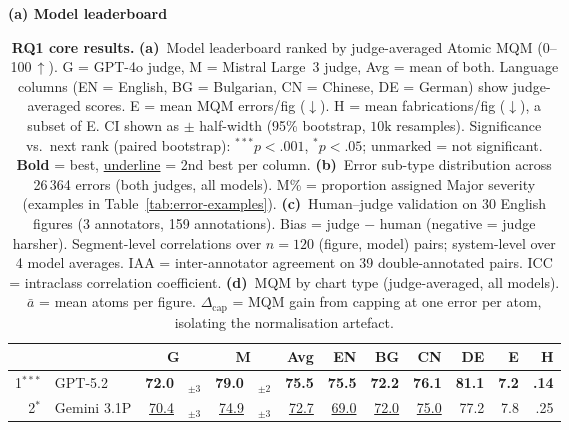 \begin{table}[t]
\centering
\caption{\textbf{RQ1 core results.}
  \textbf{(a)}~Model leaderboard ranked by judge-averaged Atomic MQM (0--100\,$\uparrow$). G = GPT-4o judge, M = Mistral Large~3 judge, Avg = mean of both. Language columns (EN = English, BG = Bulgarian, CN = Chinese, DE = German) show judge-averaged scores. E = mean MQM errors/fig ($\downarrow$). H = mean fabrications/fig ($\downarrow$), a subset of E. CI shown as $\pm$ half-width (95\% bootstrap, $10\text{k}$ resamples). Significance vs.\ next rank (paired bootstrap): $^{***}\!p{<}.001$, $^{*}\!p{<}.05$; unmarked = not significant. \textbf{Bold} = best, \underline{underline} = 2nd best per column.
  \textbf{(b)}~Error sub-type distribution across 26\,364 errors (both judges, all models). M\% = proportion assigned Major severity (examples in Table~\ref{tab:error-examples}).
  \textbf{(c)}~Human--judge validation on 30 English figures (3 annotators, 159 annotations). Bias = judge $-$ human (negative = judge harsher). Segment-level correlations over $n{=}120$ (figure, model) pairs; system-level over 4 model averages. IAA = inter-annotator agreement on 39 double-annotated pairs. ICC = intraclass correlation coefficient.
  \textbf{(d)}~MQM by chart type (judge-averaged, all models). $\bar{a}$ = mean atoms per figure. $\Delta_{\text{cap}}$ = MQM gain from capping at one error per atom, isolating the normalisation artefact.
}\label{tab:leaderboard}\label{tab:errors-charts}\label{tab:human-judge}
\vspace{-2pt}
\scriptsize
\setlength{\tabcolsep}{2pt}
\begin{minipage}[t]{0.66\textwidth}
\centering
\textbf{(a) Model leaderboard}\\[2pt]
\begin{tabular}{@{}r@{\;}l@{\;\;}r@{\,}l@{\;\;}r@{\,}l@{\;\;}r@{\;\;}rrrr@{\;\;}r@{\;}r@{}}
\toprule
 & & \multicolumn{2}{c}{\textbf{G}} & \multicolumn{2}{c}{\textbf{M}} & \textbf{Avg} & \textbf{EN} & \textbf{BG} & \textbf{CN} & \textbf{DE} & \textbf{E} & \textbf{H} \\
\midrule
1$^{***}$ & GPT-5.2              & \textbf{72.0} & {\tiny$_{\pm3}$} & \textbf{79.0} & {\tiny$_{\pm2}$} & \textbf{75.5} & \textbf{75.5} & \textbf{72.2} & \textbf{76.1} & \textbf{81.1} & \textbf{7.2} & \textbf{.14} \\
2$^{*}$   & Gemini 3.1P          & \underline{70.4} & {\tiny$_{\pm3}$} & \underline{74.9} & {\tiny$_{\pm3}$} & \underline{72.7} & \underline{69.0} & \underline{72.0} & \underline{75.0} & 77.2 & 7.8 & .25 \\

\end{tabular}
\end{minipage}
\end{table}
